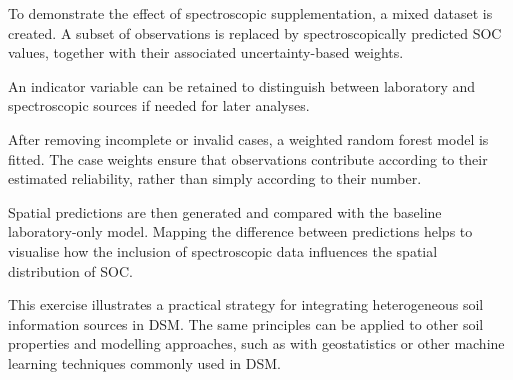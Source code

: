 \documentclass[
  10pt,
  b5paper,
  oneside]{book}
\begin{document}
To demonstrate the effect of spectroscopic supplementation, a mixed dataset is created. A subset of observations is replaced by spectroscopically predicted SOC values, together with their associated uncertainty-based weights.

An indicator variable can be retained to distinguish between laboratory and spectroscopic sources if needed for later analyses.

After removing incomplete or invalid cases, a weighted random forest model is fitted. The case weights ensure that observations contribute according to their estimated reliability, rather than simply according to their number.

Spatial predictions are then generated and compared with the baseline laboratory-only model. Mapping the difference between predictions helps to visualise how the inclusion of spectroscopic data influences the spatial distribution of SOC.

This exercise illustrates a practical strategy for integrating heterogeneous soil information sources in DSM. The same principles can be applied to other soil properties and modelling approaches, such as with geostatistics or other machine learning techniques commonly used in DSM.
\end{document}
